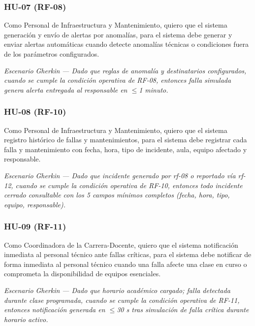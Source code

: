 \subsubsection*{HU-07 (RF-08)}


Como Personal de Infraestructura y Mantenimiento, quiero que el sistema generación y envío de alertas por anomalías, para el sistema debe generar y enviar alertas automáticas cuando detecte anomalías técnicas o condiciones fuera de los parámetros configurados.


\textit{Escenario }\textit{Gherkin}\textit{ --- Dado que reglas de anomalía y destinatarios configurados, cuando se cumple la condición operativa de RF-08, entonces falla simulada genera alerta entregada al responsable en $\leq$1 minuto.}


\subsubsection*{HU-08 (RF-10)}


Como Personal de Infraestructura y Mantenimiento, quiero que el sistema registro histórico de fallas y mantenimientos, para el sistema debe registrar cada falla y mantenimiento con fecha, hora, tipo de incidente, aula, equipo afectado y responsable.


\textit{Escenario }\textit{Gherkin}\textit{ --- Dado que incidente generado por rf-08 o reportado vía rf-12, cuando se cumple la condición operativa de RF-10, entonces todo incidente cerrado consultable con los 5 campos mínimos completos (fecha, hora, tipo, equipo, responsable).}


\subsubsection*{HU-09 (RF-11)}


Como Coordinadora de la Carrera-Docente, quiero que el sistema notificación inmediata al personal técnico ante fallas críticas, para el sistema debe notificar de forma inmediata al personal técnico cuando una falla afecte una clase en curso o comprometa la disponibilidad de equipos esenciales.


\textit{Escenario }\textit{Gherkin}\textit{ --- Dado que horario académico cargado; falla detectada durante clase programada, cuando se cumple la condición operativa de RF-11, entonces notificación generada en $\leq$30 s tras simulación de falla crítica durante horario activo.}


